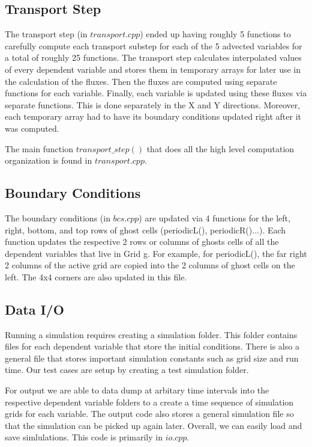 \documentclass[11pt]{article}
\begin{document}
\subsection{Transport Step}
The transport step (in $transport.cpp$) ended up having roughly 5 functions to carefully compute each transport substep for each of the 5 advected variables for a total of roughly 25 functions. The transport step calculates interpolated values of every dependent variable and stores them in temporary arrays for later use in the calculation of the fluxes. Then the fluxes are computed using separate functions for each variable. Finally, each variable is updated using these fluxes via separate functions. This is done separately in the X and Y directions. Moreover, each temporary array had to have its boundary conditions updated right after it was computed.

The main function $transport\_step()$ that does all the high level computation organization is found in $transport.cpp$.

\subsection{Boundary Conditions}
The boundary conditions (in $bcs.cpp$) are updated via 4 functions for the left, right, bottom, and top rows of ghost cells (periodicL(), periodicR()...). Each function updates the respective 2 rows or columns of ghosts cells of all the dependent variables that live in Grid g. For example, for periodicL(), the far right 2 columns of the active grid are copied into the 2 columns of ghost cells on the left. The 4x4 corners are also updated in this file.     

\subsection{Data I/O}
Running a simulation requires creating a simulation folder. This folder contains files for each dependent variable that store the initial conditions. There is also a general file that stores important simulation constants such as grid size and run time. Our test cases are setup by creating a test simulation folder. 
    
    For output we are able to data dump at arbitary time intervals into the respective dependent variable folders to a create a time sequence of simulation grids for each variable. The output code also stores a general simulation file so that the simulation can be picked up again later. Overall, we can easily load and save simlulations. This code is primarily in $io.cpp$.
    
\end{document}
